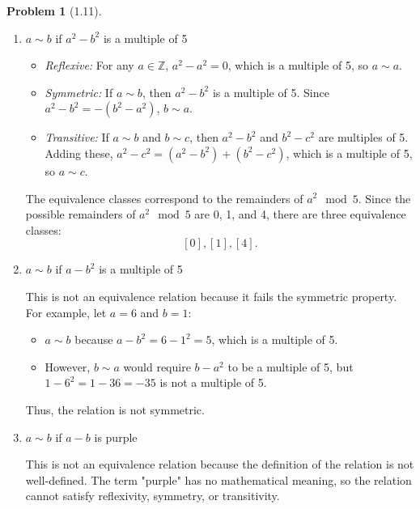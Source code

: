 \documentclass[12pt]{article}
\theoremstyle{definition}
\newtheorem{problem}{Problem}
\begin{document}
\begin{problem}[1.11]
\begin{enumerate}[label=(\alph*)]
        \item $a \sim b$ if $a^2 - b^2$ is a multiple of 5
        \begin{solution}
            \begin{itemize}
                \item \textit{Reflexive:} For any \( a \in \mathbb{Z} \), \( a^2 - a^2 = 0 \), which is a multiple of 5, so \( a \sim a \).
                \item \textit{Symmetric:} If \( a \sim b \), then \( a^2 - b^2 \) is a multiple of 5. Since \( a^2 - b^2 = -(b^2 - a^2) \), \( b \sim a \).
                \item \textit{Transitive:} If \( a \sim b \) and \( b \sim c \), then \( a^2 - b^2 \) and \( b^2 - c^2 \) are multiples of 5. Adding these, \( a^2 - c^2 = (a^2 - b^2) + (b^2 - c^2) \), which is a multiple of 5, so \( a \sim c \).
            \end{itemize}
            The equivalence classes correspond to the remainders of \( a^2 \mod 5 \). Since the possible remainders of \( a^2 \mod 5 \) are 0, 1, and 4, there are three equivalence classes:
            \[
            [0], [1], [4].
            \]
        \end{solution}

        \item $a \sim b$ if $a - b^2$ is a multiple of 5

        \begin{solution}
            This is not an equivalence relation because it fails the symmetric property. For example, let \( a = 6 \) and \( b = 1 \):
            \begin{itemize}
                \item \( a \sim b \) because \( a - b^2 = 6 - 1^2 = 5 \), which is a multiple of 5.
                \item However, \( b \sim a \) would require \( b - a^2 \) to be a multiple of 5, but \( 1 - 6^2 = 1 - 36 = -35 \) is not a multiple of 5.
            \end{itemize}
            Thus, the relation is not symmetric.
        \end{solution}

        \item $a \sim b$ if $a - b$ is purple
        
        \begin{solution}
            This is not an equivalence relation because the definition of the relation is not well-defined. The term "purple" has no mathematical meaning, so the relation cannot satisfy reflexivity, symmetry, or transitivity.
        \end{solution}
    \end{enumerate}
\end{problem}
\end{document}

